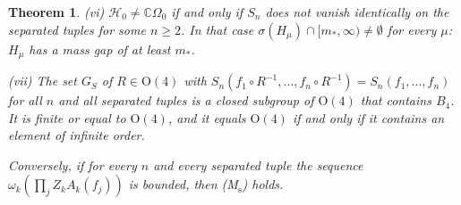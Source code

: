 \documentclass[aps,prd,twocolumn,superscriptaddress,nofootinbib,longbibliography,floatfix,amsmath,amssymb,10pt]{revtex4-2}
\newtheorem{theorem}{Theorem}
\theoremstyle{definition}
\theoremstyle{remark}
\newcommand{\C}{\mathbb{C}}
\begin{document}
\begin{theorem}
\textup{(vi)} $\mathcal H_0\ne\C\Omega_0$ if and only if $S_n$ does not
vanish identically on the separated tuples for some $n\ge2$. In that case
$\sigma(H_\mu)\cap[m_*,\infty)\ne\emptyset$ for every $\mu$: $H_\mu$ has a
mass gap of at least $m_*$.

\textup{(vii)} The set $G_S$ of $R\in\mathrm O(4)$ with $S_n(f_1\circ
R^{-1},\dots,f_n\circ R^{-1})=S_n(f_1,\dots,f_n)$ for all $n$ and all
separated tuples is a closed subgroup of $\mathrm O(4)$ that contains
$B_4$. It is finite or equal to $\mathrm O(4)$, and it equals $\mathrm O(4)$
if and only if it contains an element of infinite order.

Conversely, if for every $n$ and every separated tuple the sequence
$\omega_k(\prod_jZ_kA_k(f_j))$ is bounded, then \textup{(M$_{\mathrm s}$)}
holds.
\end{theorem}
\end{document}
